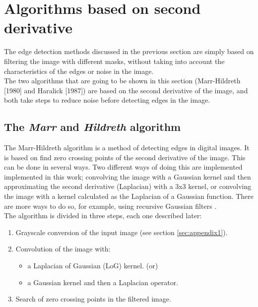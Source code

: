 \documentclass{ipol}
\numberwithin{equation}{section}
\numberwithin{table}{section}
\numberwithin{figure}{section}
\begin{document}

\section{Algorithms based on second derivative}
\label{sec:second}

The edge detection methods discussed in the previous section are simply based on filtering the 
image with different masks, without taking into account the characteristics of the edges or 
noise in the image.\\

The two algorithms that are going to be shown in this section (Marr-Hildreth \cite{AIM-518} [1980] and Haralick \cite{bb20239} [1987]) 
are based on the second derivative of the image, and both take steps to reduce noise before 
detecting edges in the image.


\subsection{The \textit{Marr} and \textit{Hildreth} algorithm}

The Marr-Hildreth algorithm is a method of detecting edges in digital 
images. It is based on find zero crossing points of the second derivative
of the image. This can be done in several ways. Two different ways of doing 
this are implemented implemented in this work; convolving the image with a Gaussian kernel and then 
approximating the second derivative (Laplacian) with a 3x3 kernel, or 
convolving the image with a kernel calculated as the Laplacian of a 
Gaussian function. There are more ways to do so, for example, using 
recursive Gaussian filters \cite{Deriche1993Recursively}.\\

The algorithm is divided in three steps, each one described later:
\begin{enumerate}
	\item Grayscale conversion of the input image (see section \ref{sec:appendix1}).
	\item Convolution of the image with:
	\begin{itemize}
		\item a Laplacian of Gaussian (LoG) kernel. (or)
		\item a Gaussian kernel and then a Laplacian operator.
	\end{itemize}
	\item Search of zero crossing points in the filtered image.
\end{enumerate}
\end{document}
